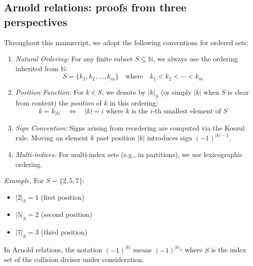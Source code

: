\subsection{Arnold relations: proofs from three perspectives}

\begin{convention}\label{conv:set-ordering-arnold}
Throughout this manuscript, we adopt the following conventions for ordered sets:

\begin{enumerate}
\item \emph{Natural Ordering:} For any finite subset $S \subseteq \mathbb{N}$, 
we always use the ordering inherited from $\mathbb{N}$:
\[S = \{k_1, k_2, \ldots, k_m\} \quad \text{where} \quad k_1 < k_2 < \cdots < k_m\]

\item \emph{Position Function:} For $k \in S$, we denote by $|k|_S$ (or simply $|k|$ 
when $S$ is clear from context) the \emph{position} of $k$ in this ordering:
\[k = k_{|k|} \quad \iff \quad |k| = i \text{ where } k \text{ is the } i\text{-th smallest element of } S\]

\item \emph{Sign Convention:} Signs arising from reordering are computed via the 
Koszul rule. Moving an element $k$ past position $|k|$ introduces sign $(-1)^{|k|-1}$.

\item \emph{Multi-indices:} For multi-index sets (e.g., in partitions), we use 
lexicographic ordering.
\end{enumerate}

\emph{Example.} For $S = \{2, 5, 7\}$:
\begin{itemize}
\item $|2|_S = 1$ (first position)
\item $|5|_S = 2$ (second position)  
\item $|7|_S = 3$ (third position)
\end{itemize}

In Arnold relations, the notation $(-1)^{|k|}$ means $(-1)^{|k|_S}$ where $S$ is the 
index set of the collision divisor under consideration.
\end{convention}

